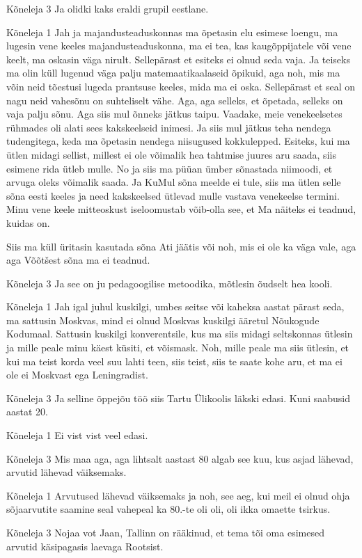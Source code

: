Kõneleja 3
Ja olidki kaks eraldi grupil eestlane. 

Kõneleja 1
Jah ja majandusteaduskonnas ma õpetasin elu esimese loengu, ma lugesin vene keeles majandusteaduskonna, ma ei tea, kas kaugõppijatele või vene keelt, ma oskasin väga nirult. Sellepärast et esiteks ei olnud seda vaja. Ja teiseks ma olin küll lugenud väga palju matemaatikaalaseid õpikuid, aga noh, mis ma võin neid tõestusi lugeda prantsuse keeles, mida ma ei oska. Sellepärast et seal on nagu neid vahesõnu on suhteliselt vähe. Aga, aga selleks, et õpetada, selleks on vaja palju sõnu. Aga siis mul õnneks jätkus taipu. Vaadake, meie venekeelsetes rühmades oli alati sees kakskeelseid inimesi. Ja siis mul jätkus teha nendega tudengitega, keda ma õpetasin nendega niisugused kokkulepped. Esiteks, kui ma ütlen midagi sellist, millest ei ole võimalik hea tahtmise juures aru saada, siis esimene rida ütleb mulle. No ja siis ma püüan ümber sõnastada niimoodi, et arvuga oleks võimalik saada. Ja KuMul sõna meelde ei tule, siis ma ütlen selle sõna eesti keeles ja need kakskeelsed ütlevad mulle vastava venekeelse termini. Minu vene keele mitteoskust iseloomustab võib-olla see, et Ma näiteks ei teadnud, kuidas on. 

Siis ma küll üritasin kasutada sõna Ati jäätis või noh, mis ei ole ka väga vale, aga aga Võõtšest sõna ma ei teadnud. 

Kõneleja 3
Ja see on ju pedagoogilise metoodika, mõtlesin õudselt hea kooli. 

Kõneleja 1
Jah igal juhul kuskilgi, umbes seitse või kaheksa aastat pärast seda, ma sattusin Moskvas, mind ei olnud Moskvas kuskilgi ääretul Nõukogude Kodumaal. Sattusin kuskilgi konverentsile, kus ma siis midagi seltskonnas ütlesin ja mille peale minu käest küsiti, et võismask. Noh, mille peale ma siis ütlesin, et kui ma teist korda veel suu lahti teen, siis teist, siis te saate kohe aru, et ma ei ole ei Moskvast ega Leningradist. 

Kõneleja 3
Ja selline õppejõu töö siis Tartu Ülikoolis läkski edasi. Kuni saabusid aastat 20. 

Kõneleja 1
Ei vist vist veel edasi. 

Kõneleja 3
Mis maa aga, aga lihtsalt aastast 80 algab see kuu, kus asjad lähevad, arvutid lähevad väiksemaks. 

Kõneleja 1
Arvutused lähevad väiksemaks ja noh, see aeg, kui meil ei olnud ohja sõjaarvutite saamine seal vahepeal ka 80.-te oli oli, oli ikka omaette tsirkus. 

Kõneleja 3
Nojaa vot Jaan, Tallinn on rääkinud, et tema tõi oma esimesed arvutid käsipagasis laevaga Rootsist. 

